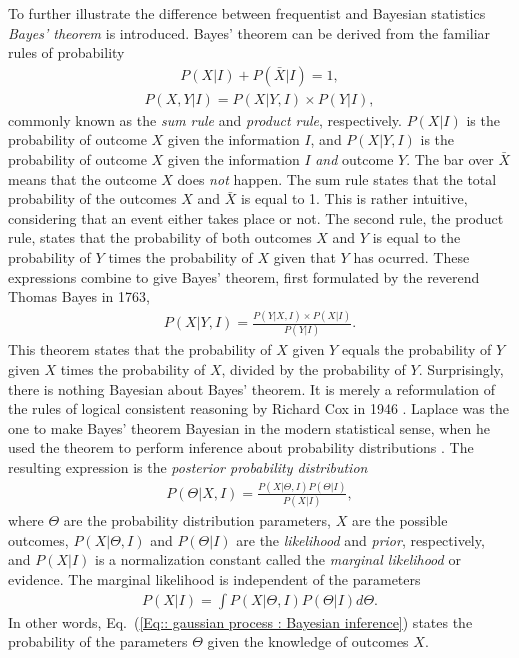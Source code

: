 \documentclass[twoside,english]{uiofysmaster}
\begin{document}
To further illustrate the difference between frequentist and Bayesian statistics \textit{Bayes' theorem} \cite{mr1763essay} is introduced. Bayes' theorem can be derived from the familiar rules of probability
\begin{align}\label{Eq:: Sum rule}
P(X | I) + P(\bar{X} | I) = 1,
\end{align}
\begin{align}\label{Eq:: Product rule}
P(X, Y | I) = P(X | Y, I) \times P(Y | I),
\end{align} 
commonly known as the \textit{sum rule} and \textit{product rule}, respectively. $P(X|I)$ is the probability of outcome $X$ given the information $I$, and $P(X|Y,I)$ is the probability of outcome $X$ given the information $I$ \textit{and} outcome $Y$. The bar over $\bar{X}$ means that the outcome $X$ does \textit{not} happen. The sum rule states that the total probability of the outcomes $X$ and $\bar{X}$ is equal to 1. This is rather intuitive, considering that an event either takes place or not. The second rule, the product rule, states that the probability of both outcomes $X$ and $Y$ is equal to the probability of $Y$ times the probability of $X$ given that $Y$ has ocurred. These expressions combine to give Bayes' theorem, first formulated by the reverend Thomas Bayes in 1763,
\begin{align}\label{Eq:: gaussian process : Bayes theorem}
P(X | Y, I) = \frac{P(Y | X, I) \times P(X | I)}{P(Y | I)}.
\end{align}
This theorem states that the probability of $X$ given $Y$ equals the probability of $Y$ given $X$ times the probability of $X$, divided by the probability of $Y$. Surprisingly, there is nothing Bayesian about Bayes' theorem. It is merely a reformulation of the rules of logical consistent reasoning by Richard Cox in 1946 \cite{sivia2006data}. Laplace was the one to make Bayes' theorem Bayesian in the modern statistical sense, when he used the theorem to perform inference about probability distributions \cite{laplace1820theorie}. The resulting expression is the \textit{posterior probability distribution}
\begin{align}\label{Eq:: gaussian process : Bayesian inference}
P(\Theta | X , I) = \frac{P(X|\Theta, I) P(\Theta| I)}{P(X | I)},
\end{align}
where $\Theta$ are the probability distribution parameters, $X$ are the possible outcomes, $P(X|\Theta, I)$  and $P(\Theta |I)$ are the \textit{likelihood} and \textit{prior}, respectively, and $P(X|I)$ is a normalization constant called the \textit{marginal likelihood} or evidence. The marginal likelihood is independent of the parameters
\begin{align}
P(X|I) = \int P(X| \Theta, I) P(\Theta | I) d \Theta.
\end{align}
In other words, Eq.~(\ref{Eq:: gaussian process : Bayesian inference}) states the probability of the parameters $\Theta$ given the knowledge of outcomes $X$.
\end{document}
